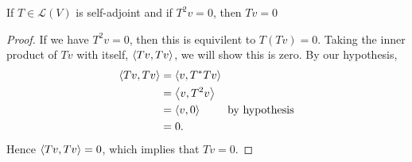 If $T \in \mathcal{L}(V)$ is self-adjoint and if $T^2v = 0$, then $Tv=0$
\vspace{.2in}

\begin{proof} If we have $T^2v = 0$, then this is equivilent to $T(Tv) = 0$. Taking the inner product of $Tv$ with itself, $\left\langle{Tv, Tv}\right\rangle$, we will show this is zero. By our hypothesis, 
    \begin{align*}
        \left\langle{Tv, Tv}\right\rangle &= \left\langle{v, T^*Tv}\right\rangle \\ &= \left\langle{v, T^2 v}\right\rangle \\ &= \left\langle{v,0}\right\rangle \qquad \text{ by  hypothesis} \\ &= 0. 
    \end{align*}
    Hence $\left\langle{Tv, Tv}\right\rangle = 0$, which implies that $Tv = 0$.
\end{proof}